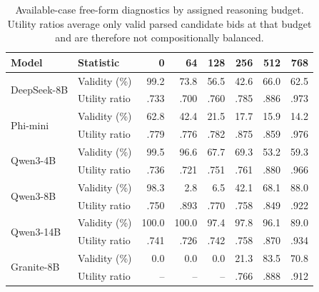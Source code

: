 \begin{table}[H]
\centering
\caption{Available-case free-form diagnostics by assigned reasoning budget. Utility ratios average only valid parsed candidate bids at that budget and are therefore not compositionally balanced.}
\label{tab:freeformbybudget}
\scriptsize
\setlength{\tabcolsep}{3.8pt}
\begin{tabular}{llrrrrrr}
\toprule
Model & Statistic & 0 & 64 & 128 & 256 & 512 & 768 \\
\midrule
\multirow{2}{*}{DeepSeek-8B} & Validity (\%) & 99.2 & 73.8 & 56.5 & 42.6 & 66.0 & 62.5 \\
 & Utility ratio & .733 & .700 & .760 & .785 & .886 & .973 \\
\multirow{2}{*}{Phi-mini} & Validity (\%) & 62.8 & 42.4 & 21.5 & 17.7 & 15.9 & 14.2 \\
 & Utility ratio & .779 & .776 & .782 & .875 & .859 & .976 \\
\multirow{2}{*}{Qwen3-4B} & Validity (\%) & 99.5 & 96.6 & 67.7 & 69.3 & 53.2 & 59.3 \\
 & Utility ratio & .736 & .721 & .751 & .761 & .880 & .966 \\
\multirow{2}{*}{Qwen3-8B} & Validity (\%) & 98.3 & 2.8 & 6.5 & 42.1 & 68.1 & 88.0 \\
 & Utility ratio & .750 & .893 & .770 & .758 & .849 & .922 \\
\multirow{2}{*}{Qwen3-14B} & Validity (\%) & 100.0 & 100.0 & 97.4 & 97.8 & 96.1 & 89.0 \\
 & Utility ratio & .741 & .726 & .742 & .758 & .870 & .934 \\
\multirow{2}{*}{Granite-8B} & Validity (\%) & 0.0 & 0.0 & 0.0 & 21.3 & 83.5 & 70.8 \\
 & Utility ratio & -- & -- & -- & .766 & .888 & .912 \\
\bottomrule
\end{tabular}
\end{table}
